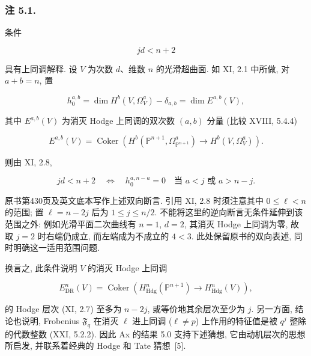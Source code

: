 \subsubsection*{注 5.1.}
条件

\begin{equation}\tag{5.1.1}
jd<n+2
\end{equation}

具有上同调解释. 设 $V$ 为次数 $d$、维数 $n$ 的光滑超曲面.
如 XI, 2.1 中所做, 对 $a+b=n$, 置

\begin{equation}\tag{5.1.2}
h_0^{a,b}
=\dim H^b(V,\Omega_V^a)-\delta_{a,b}
=\dim E^{a,b}(V),
\end{equation}

其中 $E^{a,b}(V)$ 为消灭 Hodge 上同调的双次数 $(a,b)$ 分量 (比较 XVIII, 5.4.4)

\begin{equation}\tag{5.1.3}
E^{a,b}(V)
=\operatorname{Coker}\!\left(
H^b(\mathbb P^{n+1},\Omega_{\mathbb P^{n+1}}^a)
\longrightarrow H^b(V,\Omega_V^a)\right).
\end{equation}

则由 XI, 2.8,

\begin{equation}\tag{5.1.4}
jd<n+2
\quad\Longleftrightarrow\quad
h_0^{a,n-a}=0\quad\text{当 }a<j\text{ 或 }a>n-j.
\end{equation}

\begin{editorialnote}
原书第430页及英文底本写作上述双向断言. 引用 XI, 2.8 时须注意其中
$0\leq\ell<n$ 的范围; 置 $\ell=n-2j$ 后为 $1\leq j\leq n/2$.
不能将这里的逆向断言无条件延伸到该范围之外: 例如光滑平面二次曲线有 $n=1$, $d=2$,
其消灭 Hodge 上同调为零, 故取 $j=2$ 时右端仍成立, 而左端成为不成立的 $4<3$.
此处保留原书的双向表述, 同时明确这一适用范围问题.
\end{editorialnote}

换言之, 此条件说明 $V$ 的消灭 Hodge 上同调

\[
E_{\mathrm{DR}}^n(V)
=\operatorname{Coker}\!\left(
H_{\mathrm{Hdg}}^n(\mathbb P^{n+1})
\longrightarrow H_{\mathrm{Hdg}}^n(V)\right),
\]

的 Hodge 层次 (XI, 2.7) 至多为 $n-2j$, 或等价地其余层次至少为 $j$.
另一方面, 结论也说明, Frobenius $\mathfrak F_q$ 在消灭 $\ell$ 进上同调
($\ell\ne p$) 上作用的特征值是被 $q^j$ 整除的代数整数 (XXI, 5.2.2).
因此 Ax 的结果 5.0 支持下述猜想, 它由动机层次的思想所启发,
并联系着经典的 Hodge 和 Tate 猜想~[5].

